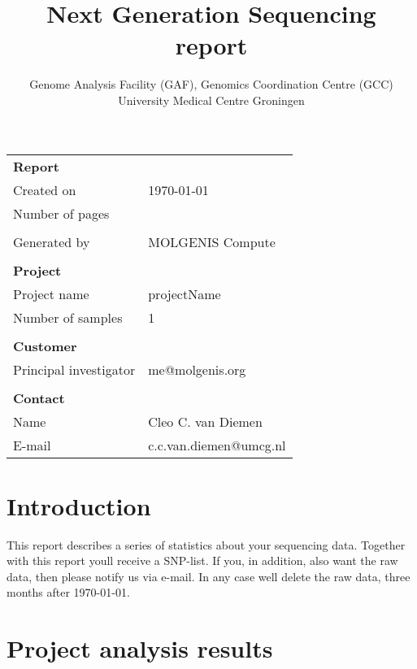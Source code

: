 \documentclass[a4paper,12pt]{article}
\title{Next Generation Sequencing report}
\author{\small Genome Analysis Facility (GAF), Genomics Coordination Centre (GCC)\\
\small University Medical Centre Groningen}
\begin{document}
\maketitle
\thispagestyle{empty}
\vspace{40mm}

\begin{table}[h]
	\centering
	\begin{tabular}{l l}
		\hline
		\multicolumn{2}{l}{\textbf{Report}} \\
		Created on & \today \\
		Number of pages & \pageref{LastPage} \\ \\
		Generated by & MOLGENIS Compute \\
		\\
		\multicolumn{2}{l}{\textbf{Project}} \\
		Project name & projectName \\
		Number of samples & 1 \\
		\\
		\multicolumn{2}{l}{\textbf{Customer}} \\
		Principal investigator & me@molgenis.org \\
		\\
		\multicolumn{2}{l}{\textbf{Contact}} \\
		Name & Cleo C. van Diemen \\
		E-mail & c.c.van.diemen@umcg.nl \\
		\hline
	\end{tabular}
\end{table}

\clearpage
\tableofcontents

\clearpage
\section*{Introduction}
This report describes a series of statistics about your sequencing data. Together with this report youll receive a SNP-list. If you, in addition, also want the raw data, then please notify us via e-mail. In any case well delete the raw data, three months after \today.

\clearpage
\section*{Project analysis results}
\end{document}
